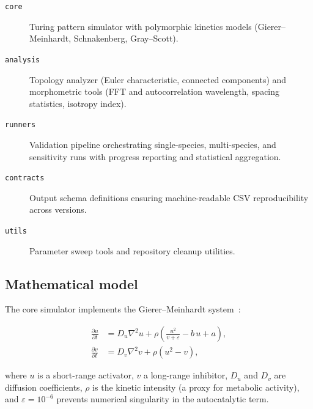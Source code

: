 \documentclass[review,3p]{elsarticle}
\begin{document}
\begin{description}
  \item[\texttt{core}] Turing pattern simulator with polymorphic
    kinetics models (Gierer--Meinhardt, Schnakenberg, Gray--Scott).
  \item[\texttt{analysis}] Topology analyzer (Euler characteristic,
    connected components) and morphometric tools (FFT and
    autocorrelation wavelength, spacing statistics, isotropy index).
  \item[\texttt{runners}] Validation pipeline orchestrating
    single-species, multi-species, and sensitivity runs with progress
    reporting and statistical aggregation.
  \item[\texttt{contracts}] Output schema definitions ensuring
    machine-readable CSV reproducibility across versions.
  \item[\texttt{utils}] Parameter sweep tools and repository cleanup
    utilities.
\end{description}


\subsection{Mathematical model}
\label{sec:model}

The core simulator implements the Gierer--Meinhardt
system~\cite{gierer1972}:

\begin{equation}
\label{eq:gm}
\begin{aligned}
  \frac{\partial u}{\partial t}
    &= D_u \nabla^2 u + \rho\!\left(\frac{u^2}{v + \varepsilon}
      - b\,u + a\right), \\[4pt]
  \frac{\partial v}{\partial t}
    &= D_v \nabla^2 v + \rho\!\left(u^2 - v\right),
\end{aligned}
\end{equation}

\noindent where $u$ is a short-range activator, $v$ a long-range
inhibitor, $D_u$ and $D_v$ are diffusion coefficients, $\rho$ is
the kinetic intensity (a proxy for metabolic activity), and
$\varepsilon = 10^{-6}$ prevents numerical singularity in the
autocatalytic term.
\end{document}
